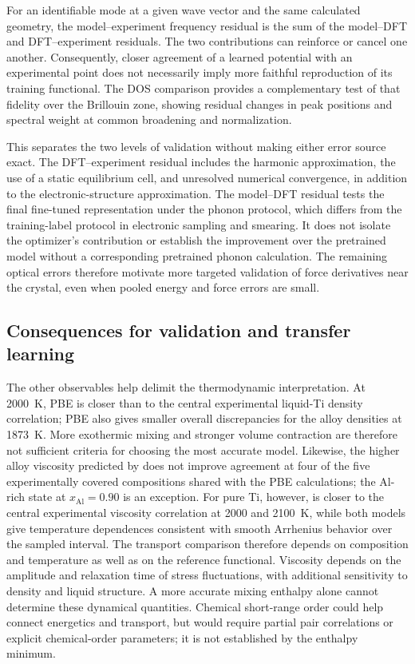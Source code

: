 For an identifiable mode at a given wave vector and the same calculated geometry, the model--experiment frequency residual is the sum of the model--DFT and DFT--experiment residuals.
The two contributions can reinforce or cancel one another.
Consequently, closer agreement of a learned potential with an experimental point does not necessarily imply more faithful reproduction of its training functional.
The DOS comparison provides a complementary test of that fidelity over the Brillouin zone, showing residual changes in peak positions and spectral weight at common broadening and normalization.

This separates the two levels of validation without making either error source exact.
The DFT--experiment residual includes the harmonic approximation, the use of a static equilibrium cell, and unresolved numerical convergence, in addition to the electronic-structure approximation.
The model--DFT residual tests the final fine-tuned representation under the phonon protocol, which differs from the training-label protocol in electronic sampling and smearing.
It does not isolate the optimizer's contribution or establish the improvement over the pretrained model without a corresponding pretrained phonon calculation.
The remaining optical errors therefore motivate more targeted validation of force derivatives near the crystal, even when pooled energy and force errors are small.

\subsection{Consequences for validation and transfer learning}

The other observables help delimit the thermodynamic interpretation.
At 2000~K, PBE is closer than \rscan{} to the central experimental liquid-Ti density correlation; PBE also gives smaller overall discrepancies for the alloy densities at 1873~K.
More exothermic mixing and stronger volume contraction are therefore not sufficient criteria for choosing the most accurate model.
Likewise, the higher alloy viscosity predicted by \rscan{} does not improve agreement at four of the five experimentally covered compositions shared with the PBE calculations; the Al-rich state at $x_{\mathrm{Al}}=0.90$ is an exception.
For pure Ti, however, \rscan{} is closer to the central experimental viscosity correlation at 2000 and 2100~K, while both models give temperature dependences consistent with smooth Arrhenius behavior over the sampled interval.
The transport comparison therefore depends on composition and temperature as well as on the reference functional.
Viscosity depends on the amplitude and relaxation time of stress fluctuations, with additional sensitivity to density and liquid structure.
A more accurate mixing enthalpy alone cannot determine these dynamical quantities.
Chemical short-range order could help connect energetics and transport, but would require partial pair correlations or explicit chemical-order parameters; it is not established by the enthalpy minimum.

